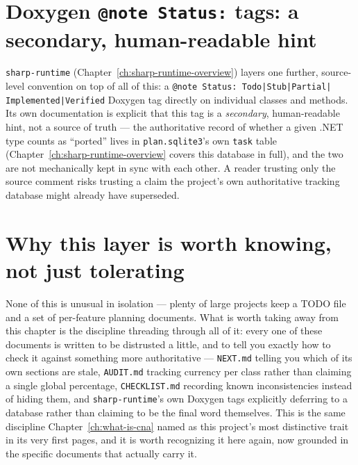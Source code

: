 \section{Doxygen \texttt{@note Status:} tags: a secondary, human-readable hint}

\texttt{sharp-runtime} (Chapter~\ref{ch:sharp-runtime-overview}) layers one further,
source-level convention on top of all of this: a \texttt{@note Status: Todo|Stub|Partial|%
Implemented|Verified} Doxygen tag directly on individual classes and methods. Its own
documentation is explicit that this tag is a \emph{secondary}, human-readable hint, not a
source of truth --- the authoritative record of whether a given .NET type counts as ``ported''
lives in \texttt{plan.sqlite3}'s own \texttt{task} table (Chapter~\ref{ch:sharp-runtime-overview}
covers this database in full), and the two are not mechanically kept in sync with each other.
A reader trusting only the source comment risks trusting a claim the project's own
authoritative tracking database might already have superseded.

\section{Why this layer is worth knowing, not just tolerating}

None of this is unusual in isolation --- plenty of large projects keep a TODO file and a set
of per-feature planning documents. What is worth taking away from this chapter is the
discipline threading through all of it: every one of these documents is written to be
distrusted a little, and to tell you exactly how to check it against something more
authoritative --- \texttt{NEXT.md} telling you which of its own sections are stale,
\texttt{AUDIT.md} tracking currency per class rather than claiming a single global percentage,
\texttt{CHECKLIST.md} recording known inconsistencies instead of hiding them, and
\texttt{sharp-runtime}'s own Doxygen tags explicitly deferring to a database rather than
claiming to be the final word themselves. This is the same discipline
Chapter~\ref{ch:what-is-cna} named as this project's most distinctive trait in its very first
pages, and it is worth recognizing it here again, now grounded in the specific documents that
actually carry it.
